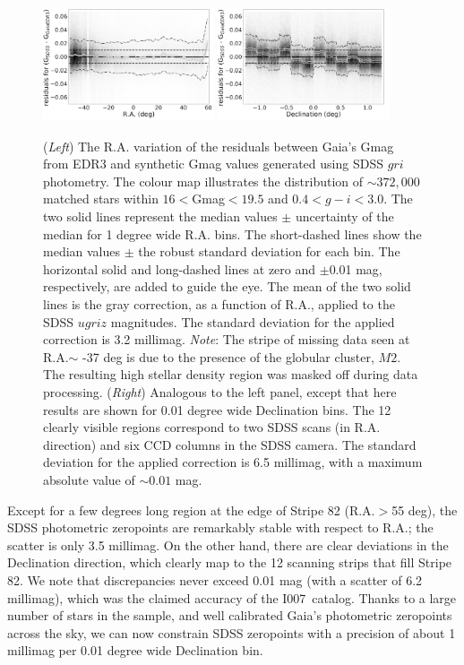 \documentclass[fleqn,usenatbib]{mnras}
\newcommand{\pOc}{\hbox{I007 catalog}}
\begin{document}
\begin{figure}
  \centering\includegraphics[width=0.45\textwidth]{figures/GmagCorrection_RA_Hess_lr.png} 
  \centering\includegraphics[width=0.45\textwidth]{figures/GmagCorrection_Dec_Hess_lr.png} 
\caption{({\it Left}) The R.A. variation of the residuals between Gaia's Gmag from EDR3
and synthetic Gmag values generated using SDSS $gri$ photometry. The 
colour map illustrates the distribution of $\sim 372,000$ matched stars within 
$16<$Gmag$<19.5$ and $0.4 < g-i < 3.0$. The two solid lines represent the 
median values $\pm$ uncertainty of the median for 1 degree wide R.A. bins. 
The short-dashed lines show the median values $\pm$ the robust standard 
deviation for each bin. The horizontal solid and long-dashed lines at zero and 
$\pm$0.01 mag, respectively, are added to guide the eye. The mean of the two 
solid lines is the gray correction, as a function of R.A., applied to the SDSS 
$ugriz$ magnitudes. The standard deviation for the applied correction is 3.2 millimag. {\it Note}: The stripe of missing data seen at R.A.$\sim$ -37 deg is due to the presence of the globular cluster, $M2$. The resulting high stellar density region was masked off during data processing.
({\it Right}) Analogous to the left panel, except that here results are shown for
0.01 degree wide Declination bins. The 12 clearly visible regions correspond to
two SDSS scans (in R.A. direction) and six CCD columns in the SDSS camera. 
The standard deviation for the applied correction is 6.5 millimag, with a maximum
absolute value of $\sim0.01$ mag.}
\label{fig:graycorrRA}
\end{figure}


Except for a few degrees long region at the edge of Stripe 82 (R.A.$>$55 deg), the
SDSS photometric zeropoints are remarkably stable with respect to R.A.; the scatter
is only 3.5 millimag. On the other hand, there are clear deviations in the Declination 
direction, which clearly map to the 12 scanning strips that fill Stripe 82. We note
that discrepancies never exceed 0.01 mag (with a scatter of 6.2 millimag), which was 
the claimed accuracy of the \pOc. Thanks to a large number of stars in the sample,
and well calibrated Gaia's photometric zeropoints across the sky, we can now 
constrain SDSS zeropoints with a precision of about 1 millimag per 0.01 degree
wide Declination bin. 
\end{document}
